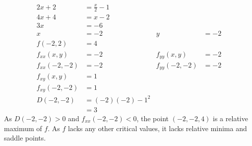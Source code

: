 \documentclass[11pt]{article}
\begin{document}
\begin{enumerate}
\begin{itemize}[ ]
\begin{align*}
								2x + 2 &= \frac{x}{2} - 1 \\
								4x + 4 &= x - 2 \\
								3x &= -6 \\
								x &= -2 &
									y &= -2 \\
							f(-2, 2) &= 4 \\
							f_{xx}(x, y) &= -2 &
								f_{yy}(x, y) &= -2 \\
							f_{xx}(-2, -2) &= -2 &
								f_{yy}(-2, -2) &= -2 \\
							f_{xy}(x, y) &= 1 \\
							f_{xy}(-2, -2) &= 1 \\
							D(-2,-2) &= (-2)(-2) - 1^2 \\
								&= 3
						\end{align*}
						As $D(-2, -2) > 0$ and $f_{xx}(-2, -2) < 0$, the point $(-2, -2, 4)$ is a relative maximum of $f$. As $f$ lacks any other critical values, it lacks relative minima and saddle points.
				\end{itemize}
		\end{enumerate}
\end{document}
